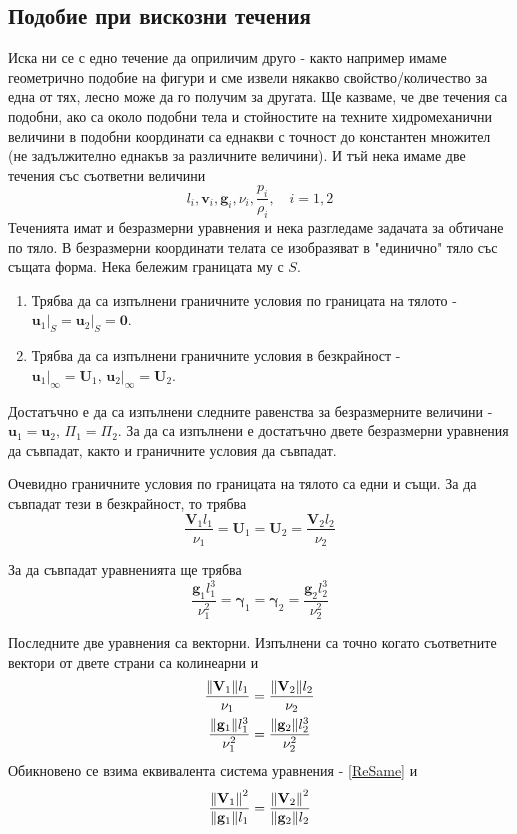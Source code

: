 \documentclass[bulgarian, 12pt]{article}
\begin{document}
\subsection{Подобие при вискозни течения}
Иска ни се с едно течение да оприличим друго - както например имаме геометрично подобие на фигури и сме извели някакво свойство/количество за една от тях, лесно може да го получим за другата.
Ще казваме, че две течения са подобни, ако са около подобни тела и стойностите на техните хидромеханични величини в подобни координати са еднакви с точност до константен множител (не задължително еднакъв за различните величини). 
И тъй нека имаме две течения със съответни величини 
\begin{equation}
	l_i, \mathbf{v}_i, \mathbf{g}_i, \nu_i, \frac{p_i}{\rho_i}, \quad i=1,2
\end{equation}
Теченията имат и безразмерни уравнения и нека разгледаме задачата за обтичане по тяло. 
В безразмерни координати телата се изобразяват в "единично" тяло със същата форма.
Нека бележим границата му с $S$. 
\begin{enumerate}
	\item Трябва да са изпълнени граничните условия по границата на тялото - $\mathbf{u}_1\vert_S = \mathbf{u}_2\vert_S = \mathbf{0}$.
	\item Трябва да са изпълнени граничните условия в безкрайност - $\mathbf{u}_1\vert_\infty = \mathbf{U}_1,\, \mathbf{u}_2\vert_\infty = \mathbf{U}_2$.
\end{enumerate}
Достатъчно е да са изпълнени следните равенства за безразмерните величини - $\mathbf{u}_1 = \mathbf{u}_2,\, \Pi_1 = \Pi_2$.
За да са изпълнени е достатъчно двете безразмерни уравнения да съвпадат, както и граничните условия да съвпадат.

Очевидно граничните условия по границата на тялото са едни и същи.
За да съвпадат тези в безкрайност, то трябва
\begin{equation}
	\frac{\mathbf{V}_1 l_1}{\nu_1} = \mathbf{U}_1 = \mathbf{U}_2 = \frac{\mathbf{V}_2 l_2}{\nu_2}
\end{equation}

За да съвпадат уравненията ще трябва
\begin{equation}
	\frac{\mathbf{g}_1 l_1^3}{\nu_1^2} = \bm{\gamma}_1 = \bm{\gamma}_2 = \frac{\mathbf{g}_2 l_2^3}{\nu_2^2}
\end{equation}

Последните две уравнения са векторни. Изпълнени са точно когато съответните вектори от двете страни са колинеарни и
\begin{gather}
	\label{ReSame} \frac{\norm{\mathbf{V}_1} l_1}{\nu_1} = \frac{\norm{\mathbf{V}_2} l_2}{\nu_2}\\
	\frac{\norm{\mathbf{g}_1} l_1^3}{\nu_1^2} = \frac{\norm{\mathbf{g}_2} l_2^3}{\nu_2^2}
\end{gather}
Обикновено се взима еквивалента система уравнения - \eqref{ReSame} и 
\begin{equation}
	\label{FrSame} \frac{\norm{\mathbf{V}_1}^2}{\norm{\mathbf{g}_1} l_1} = \frac{\norm{\mathbf{V}_2}^2}{\norm{\mathbf{g}_2} l_2}
\end{equation}
\end{document}
